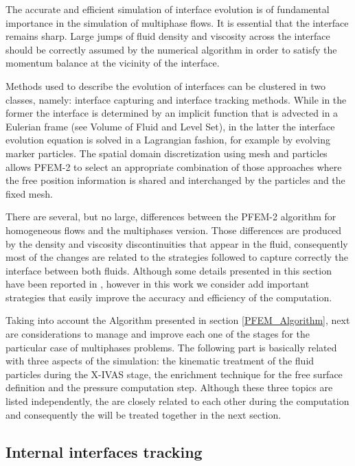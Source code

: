 The accurate and efficient simulation of interface evolution is of fundamental importance in the simulation of multiphase flows. It is essential that the interface remains sharp. Large jumps of fluid density and viscosity across the interface should be correctly assumed by the numerical algorithm in order to satisfy the momentum balance at the vicinity of the interface.

Methods used to describe the evolution of interfaces can be clustered in two classes, namely: interface capturing and interface tracking methods. While in the former the interface is determined by an implicit function that is advected in a Eulerian frame (see Volume of Fluid \cite{VoF} and Level Set\cite{Osher01}), in the latter the interface evolution equation is solved in a Lagrangian fashion, for example by evolving marker particles. The spatial domain discretization using mesh and particles allows PFEM-2 to select an appropriate combination of those approaches where the free position information is shared and interchanged by the particles and the fixed mesh.

There are several, but no large, differences between the PFEM-2 algorithm for homogeneous flows and the multiphases version. Those differences are produced by the density and viscosity discontinuities that appear in the fluid, consequently most of the changes are related to the strategies followed to capture correctly the interface between both fluids. Although some details presented in this section have been reported in \cite{Idelsohn13c}, however in this work we consider add important strategies that easily improve the accuracy and efficiency of the computation.

Taking into account the Algorithm presented in section \ref{PFEM_Algorithm}, next are considerations to manage and improve each one of the stages for the particular case of multiphases problems. The following part is basically related with three aspects of the simulation: the kinematic treatment of the fluid particles during the X-IVAS stage, the enrichment technique for the free surface definition and the pressure computation step. Although these three topics are listed independently, the are closely related to each other during the computation and consequently the will be treated together in the next section.

\subsection{Internal interfaces tracking}

